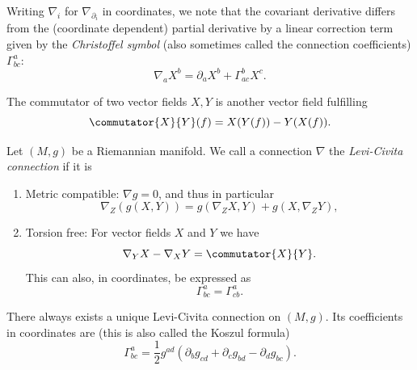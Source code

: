 \documentclass[titlepage,numbers=noenddot,headinclude,oneside,%
footinclude=true,cleardoublepage=empty,%
BCOR=5mm,paper=a4,fontsize=11pt,%
english,%
]{scrartcl}
\begin{document}
\begin{remark}
    Writing \( \nabla_i \) for \( \nabla_{\partial_i} \) in coordinates, we note that the covariant derivative differs from the (coordinate dependent) partial derivative by a linear correction term given by the \emph{Christoffel symbol} (also sometimes called the connection coefficients) \( \Gamma^a_{b c} \):
    \begin{equation*}
        \nabla_{a} X^b = \partial_a X^b+\Gamma_{ac}^b X^c.
    \end{equation*}
\end{remark}
\begin{recall}
    The commutator of two vector fields \( X,Y \) is another vector field fulfilling
    \begin{equation*}
        \commutator{X}{Y}(f)=X(Y(f))-Y(X(f)).
    \end{equation*}
\end{recall}
\begin{theorem}
    Let \( (M,g) \) be a Riemannian manifold. We call a connection \( \nabla \) the \emph{Levi-Civita connection} if it is
    \begin{enumerate}
        \item Metric compatible: \( \nabla g=0 \), and thus in particular
        \begin{equation*}
            \nabla_Z (g(X,Y))=g(\nabla_Z X, Y)+g(X,\nabla_Z Y),
        \end{equation*}
        \item Torsion free: For vector fields \( X \) and \( Y \) we have
        \begin{equation*}
            \nabla_Y X-\nabla_X Y=\commutator{X}{Y}.
        \end{equation*}
        This can also, in coordinates, be expressed as
        \begin{equation*}
            \Gamma^{a}_{bc} = \Gamma^a_{cb}.
        \end{equation*}
    \end{enumerate}
    There always exists a unique Levi-Civita connection on \( (M,g) \). Its coefficients in coordinates are (this is also called the Koszul formula)
    \begin{equation}
        \Gamma^a_{bc}=\frac{1}{2}g^{ad}(\partial_b g_{cd}+\partial_c g_{bd}-\partial_d g_{bc}).\label{eq:koszul_formula}
    \end{equation}
\end{theorem}
\end{document}
